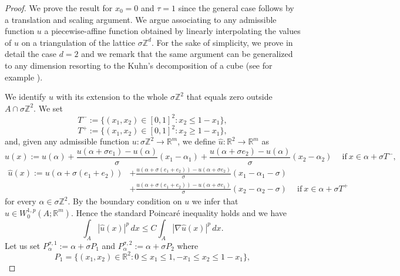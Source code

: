 \documentclass{article}
\theoremstyle{plain}
\theoremstyle{definition}
\def\rr{{\mathbb R}}
\def\ZZ{{\mathbb Z}}
\newcommand{\s}{\sigma}
\numberwithin{equation}{section}
\begin{document}
\begin{proof}
We prove the result for $x_0=0$ and $\tau=1$ since the general case follows by a translation and scaling argument. We argue associating to any admissible function $u$ a piecewise-affine function obtained by linearly interpolating the values of $u$ on a triangulation of the lattice $\s\mathbb{Z}^{d}$. For the sake of simplicity, we prove in detail the case $d=2$ and we remark that the same argument can be generalized to any dimension resorting to the Kuhn's decomposition of a cube \cite{Kuhn1960} (see for example \cite{ALP}). 

We identify $u$ with its extension to the whole $\s\mathbb{Z}^2$ that equals zero outside $A\cap \s\ZZ^2$. We set
    \begin{equation*}
        T^{-}:=\{(x_{1},x_{2})\in [0,1]^{2}: x_{2}\leq 1-x_{1}\},
    \end{equation*}
    \begin{equation*}
         T^{+}:=\{(x_{1},x_{2})\in [0,1]^{2}: x_{2}\geq 1-x_{1}\},
    \end{equation*}
    and, given any admissible function $u: \s \ZZ^2\to \rr^m$, we define $\hat{u}:\rr^2\to \rr^m$ as 
    \begin{equation*}
    \hat{u}(x):=u(\alpha)+\frac{u(\alpha+\s e_{1})-u(\alpha)}{\s}(x_{1}-\alpha_{1})+\frac{u(\alpha+\s e_{2})-u(\alpha)}{\s}(x_{2}-\alpha_{2})\ \quad \text{if}\ x \in \alpha +\s T^{-},
    \end{equation*}
    \begin{equation*}
    \begin{split}
        \hat{u}(x):=u(\alpha+\s(e_1+e_2))&+\frac{u(\alpha+\s(e_1+e_2))-u(\alpha+\s e_2)}{\s}(x_1-\alpha_1-\s)\\
&+\frac{u(\alpha+\s(e_1+e_2))-u(\alpha+\s e_1)}{\s}(x_2-\alpha_2-\s)\ \quad \text{if}\  x\in \alpha +\s T^{+}
    \end{split}
    \end{equation*}
for every $\alpha \in \s \ZZ^2$. By the boundary condition on $u$ we infer that  $\hat{u} \in W^{1,p}_0(A;\mathbb{R}^m)$. Hence the standard Poincaré inequality holds and we have
    \begin{equation}
    \label{strd_pcre}
        \int_A |\hat u(x)|^p\,dx
\leq
C\int_A |\nabla \hat u(x)|^p\,dx.
    \end{equation}
    Let us set $P^{\s,1}_{\alpha}:=\alpha+\s P_1$ and $P^{\s,2}_{\alpha}:=\alpha+\s P_2$ where 
    \begin{equation*}
        P_1=\{(x_1,x_2) \in \mathbb{R}^{2}: 0\leq x_{1}\leq 1, -x_{1}\leq x_{2}\leq 1-x_{1}\},

\end{equation*}
\end{proof}
\end{document}
